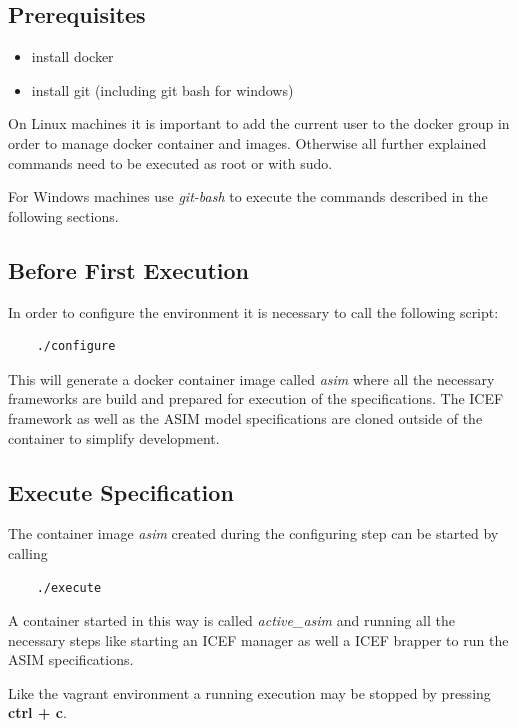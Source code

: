 \subsection{Prerequisites}

\begin{itemize}
	\item install docker
	\item install git (including git bash for windows)
\end{itemize}

On Linux machines it is important to add the current user to the docker group in order to manage docker container and images. Otherwise all further explained commands need to be executed as root or with sudo.

For Windows machines use \textit{git-bash} to execute the commands described in the following sections.

\subsection{Before First Execution}

In order to configure the environment it is necessary to call the following script:

\begin{lstlisting}
	./configure
\end{lstlisting}

This will generate a docker container image called \textit{asim} where all the necessary frameworks are build and prepared for execution of the specifications. The ICEF framework as well as the ASIM model specifications are cloned outside of the container to simplify development.

\subsection{Execute Specification}

The container image \textit{asim} created during the configuring step can be started by calling

\begin{lstlisting}
	./execute
\end{lstlisting}

A container started in this way is called \textit{active\_asim} and running all the necessary steps like starting an ICEF manager as well a ICEF brapper to run the ASIM specifications.

Like the vagrant environment a running execution may be stopped by pressing \textbf{ctrl + c}.

